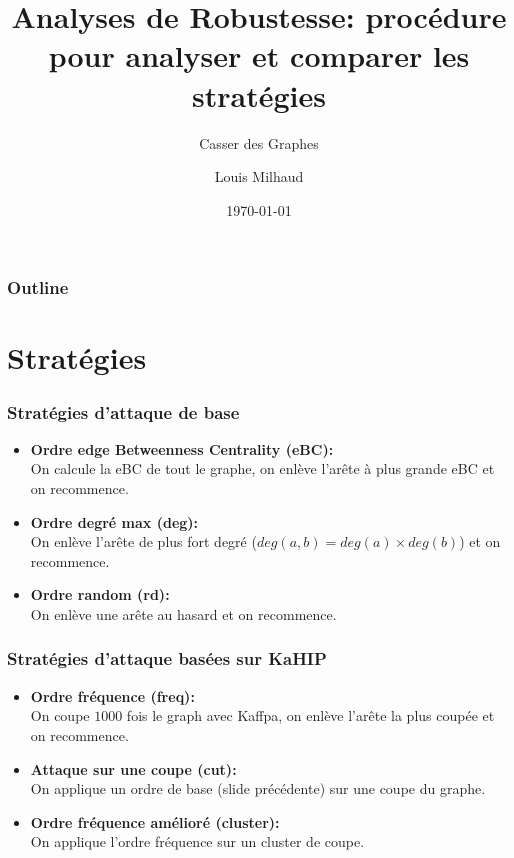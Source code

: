 \documentclass[aspectratio=169]{beamer}
\title{Analyses de Robustesse: procédure pour analyser et comparer les stratégies}
\subtitle{Casser des Graphes}
\author{Louis Milhaud}
\institute{Complex Networks - LIP6}
\date{\today}
\begin{document}
    \begin{frame}
        \titlepage
    \end{frame}

    \begin{frame}
        \frametitle{Outline}
        \tableofcontents
    \end{frame}

    \section{Stratégies}
    \begin{frame}
        \frametitle{Stratégies d'attaque de base}
        \begin{itemize}
            \item \textbf{Ordre edge Betweenness Centrality (eBC):}\\
            On calcule la eBC de tout le graphe, on enlève l'arête à plus grande eBC et on recommence.
            \item \textbf{Ordre degré max (deg):}\\
            On enlève l'arête de plus fort degré ($deg(a, b) = deg(a) \times deg(b)$) et on recommence.
            \item \textbf{Ordre random (rd):}\\
            On enlève une arête au hasard et on recommence. 
        \end{itemize}
    \end{frame}

    \begin{frame}
        \frametitle{Stratégies d'attaque basées sur KaHIP}
        \begin{itemize}
            \item \textbf{Ordre fréquence (freq):}\\
            On coupe $1000$ fois le graph avec Kaffpa, on enlève l'arête la plus coupée et on recommence.
            \item \textbf{Attaque sur une coupe (cut):}\\
            On applique un ordre de base (slide précédente) sur une coupe du graphe.
            \item \textbf{Ordre fréquence amélioré (cluster):}\\
            On applique l'ordre fréquence sur un cluster de coupe.
        \end{itemize}
    \end{frame}
\end{document}
